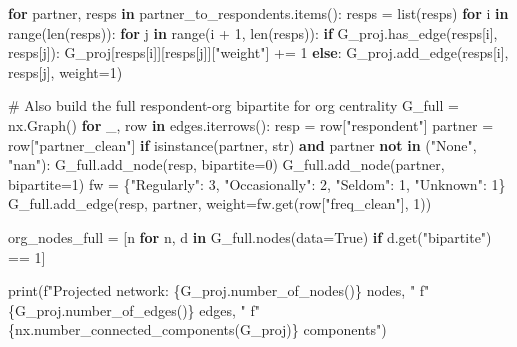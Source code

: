 \documentclass[
  letterpaper,
  DIV=11,
  numbers=noendperiod]{scrartcl}
\newenvironment{Shaded}{\begin{snugshade}}{\end{snugshade}}
\newcommand{\BuiltInTok}[1]{\textcolor[rgb]{0.00,0.23,0.31}{#1}}
\newcommand{\CommentTok}[1]{\textcolor[rgb]{0.37,0.37,0.37}{#1}}
\newcommand{\ControlFlowTok}[1]{\textcolor[rgb]{0.00,0.23,0.31}{\textbf{#1}}}
\newcommand{\DecValTok}[1]{\textcolor[rgb]{0.68,0.00,0.00}{#1}}
\newcommand{\KeywordTok}[1]{\textcolor[rgb]{0.00,0.23,0.31}{\textbf{#1}}}
\newcommand{\NormalTok}[1]{\textcolor[rgb]{0.00,0.23,0.31}{#1}}
\newcommand{\OperatorTok}[1]{\textcolor[rgb]{0.37,0.37,0.37}{#1}}
\newcommand{\SpecialCharTok}[1]{\textcolor[rgb]{0.37,0.37,0.37}{#1}}
\newcommand{\SpecialStringTok}[1]{\textcolor[rgb]{0.13,0.47,0.30}{#1}}
\newcommand{\StringTok}[1]{\textcolor[rgb]{0.13,0.47,0.30}{#1}}
\newcommand{\VariableTok}[1]{\textcolor[rgb]{0.07,0.07,0.07}{#1}}
\begin{document}
\begin{Shaded}
\begin{Highlighting}[]
\ControlFlowTok{for}\NormalTok{ partner, resps }\KeywordTok{in}\NormalTok{ partner\_to\_respondents.items():}
\NormalTok{    resps }\OperatorTok{=} \BuiltInTok{list}\NormalTok{(resps)}
    \ControlFlowTok{for}\NormalTok{ i }\KeywordTok{in} \BuiltInTok{range}\NormalTok{(}\BuiltInTok{len}\NormalTok{(resps)):}
        \ControlFlowTok{for}\NormalTok{ j }\KeywordTok{in} \BuiltInTok{range}\NormalTok{(i }\OperatorTok{+} \DecValTok{1}\NormalTok{, }\BuiltInTok{len}\NormalTok{(resps)):}
            \ControlFlowTok{if}\NormalTok{ G\_proj.has\_edge(resps[i], resps[j]):}
\NormalTok{                G\_proj[resps[i]][resps[j]][}\StringTok{"weight"}\NormalTok{] }\OperatorTok{+=} \DecValTok{1}
            \ControlFlowTok{else}\NormalTok{:}
\NormalTok{                G\_proj.add\_edge(resps[i], resps[j], weight}\OperatorTok{=}\DecValTok{1}\NormalTok{)}

\CommentTok{\# Also build the full respondent{-}org bipartite for org centrality}
\NormalTok{G\_full }\OperatorTok{=}\NormalTok{ nx.Graph()}
\ControlFlowTok{for}\NormalTok{ \_, row }\KeywordTok{in}\NormalTok{ edges.iterrows():}
\NormalTok{    resp }\OperatorTok{=}\NormalTok{ row[}\StringTok{"respondent"}\NormalTok{]}
\NormalTok{    partner }\OperatorTok{=}\NormalTok{ row[}\StringTok{"partner\_clean"}\NormalTok{]}
    \ControlFlowTok{if} \BuiltInTok{isinstance}\NormalTok{(partner, }\BuiltInTok{str}\NormalTok{) }\KeywordTok{and}\NormalTok{ partner }\KeywordTok{not} \KeywordTok{in}\NormalTok{ (}\StringTok{"None"}\NormalTok{, }\StringTok{"nan"}\NormalTok{):}
\NormalTok{        G\_full.add\_node(resp, bipartite}\OperatorTok{=}\DecValTok{0}\NormalTok{)}
\NormalTok{        G\_full.add\_node(partner, bipartite}\OperatorTok{=}\DecValTok{1}\NormalTok{)}
\NormalTok{        fw }\OperatorTok{=}\NormalTok{ \{}\StringTok{"Regularly"}\NormalTok{: }\DecValTok{3}\NormalTok{, }\StringTok{"Occasionally"}\NormalTok{: }\DecValTok{2}\NormalTok{, }\StringTok{"Seldom"}\NormalTok{: }\DecValTok{1}\NormalTok{, }\StringTok{"Unknown"}\NormalTok{: }\DecValTok{1}\NormalTok{\}}
\NormalTok{        G\_full.add\_edge(resp, partner, weight}\OperatorTok{=}\NormalTok{fw.get(row[}\StringTok{"freq\_clean"}\NormalTok{], }\DecValTok{1}\NormalTok{))}

\NormalTok{org\_nodes\_full }\OperatorTok{=}\NormalTok{ [n }\ControlFlowTok{for}\NormalTok{ n, d }\KeywordTok{in}\NormalTok{ G\_full.nodes(data}\OperatorTok{=}\VariableTok{True}\NormalTok{)}
                  \ControlFlowTok{if}\NormalTok{ d.get(}\StringTok{"bipartite"}\NormalTok{) }\OperatorTok{==} \DecValTok{1}\NormalTok{]}

\BuiltInTok{print}\NormalTok{(}\SpecialStringTok{f"Projected network: }\SpecialCharTok{\{}\NormalTok{G\_proj}\SpecialCharTok{.}\NormalTok{number\_of\_nodes()}\SpecialCharTok{\}}\SpecialStringTok{ nodes, "}
      \SpecialStringTok{f"}\SpecialCharTok{\{}\NormalTok{G\_proj}\SpecialCharTok{.}\NormalTok{number\_of\_edges()}\SpecialCharTok{\}}\SpecialStringTok{ edges, "}
      \SpecialStringTok{f"}\SpecialCharTok{\{}\NormalTok{nx}\SpecialCharTok{.}\NormalTok{number\_connected\_components(G\_proj)}\SpecialCharTok{\}}\SpecialStringTok{ components"}\NormalTok{)}
\end{Highlighting}
\end{Shaded}
\end{document}
